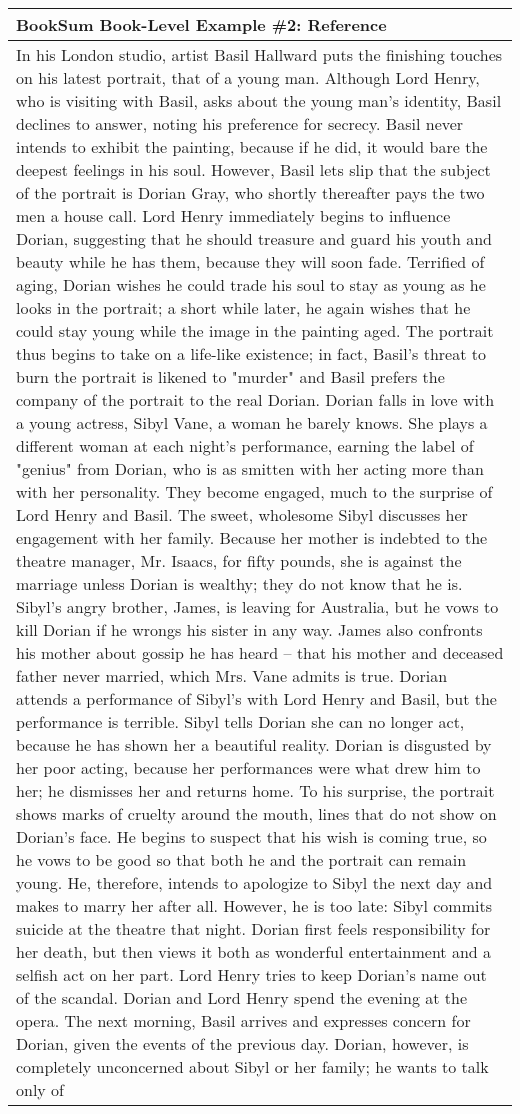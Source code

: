 \documentclass{article} \usepackage{iclr2022_conference,times}
\begin{document}
\begin{table}[!htbp]
    \centering
    \tiny    
    \begin{tabular}{p{\linewidth}} 
    \midrule
    \textbf{BookSum Book-Level Example \#2: Reference} \\
    \midrule
In his London studio, artist Basil Hallward puts the finishing touches on his latest portrait, that of a young man. Although Lord Henry, who is visiting with Basil, asks about the young man's identity, Basil declines to answer, noting his preference for secrecy. Basil never intends to exhibit the painting, because if he did, it would bare the deepest feelings in his soul. However, Basil lets slip that the subject of the portrait is Dorian Gray, who shortly thereafter pays the two men a house call. Lord Henry immediately begins to influence Dorian, suggesting that he should treasure and guard his youth and beauty while he has them, because they will soon fade. Terrified of aging, Dorian wishes he could trade his soul to stay as young as he looks in the portrait; a short while later, he again wishes that he could stay young while the image in the painting aged. The portrait thus begins to take on a life-like existence; in fact, Basil's threat to burn the portrait is likened to "murder" and Basil prefers the company of the portrait to the real Dorian. Dorian falls in love with a young actress, Sibyl Vane, a woman he barely knows. She plays a different woman at each night's performance, earning the label of "genius" from Dorian, who is as smitten with her acting more than with her personality. They become engaged, much to the surprise of Lord Henry and Basil. The sweet, wholesome Sibyl discusses her engagement with her family. Because her mother is indebted to the theatre manager, Mr. Isaacs, for fifty pounds, she is against the marriage unless Dorian is wealthy; they do not know that he is. Sibyl's angry brother, James, is leaving for Australia, but he vows to kill Dorian if he wrongs his sister in any way. James also confronts his mother about gossip he has heard -- that his mother and deceased father never married, which Mrs. Vane admits is true. Dorian attends a performance of Sibyl's with Lord Henry and Basil, but the performance is terrible. Sibyl tells Dorian she can no longer act, because he has shown her a beautiful reality. Dorian is disgusted by her poor acting, because her performances were what drew him to her; he dismisses her and returns home. To his surprise, the portrait shows marks of cruelty around the mouth, lines that do not show on Dorian's face. He begins to suspect that his wish is coming true, so he vows to be good so that both he and the portrait can remain young. He, therefore, intends to apologize to Sibyl the next day and makes to marry her after all. However, he is too late: Sibyl commits suicide at the theatre that night. Dorian first feels responsibility for her death, but then views it both as wonderful entertainment and a selfish act on her part. Lord Henry tries to keep Dorian's name out of the scandal. Dorian and Lord Henry spend the evening at the opera. The next morning, Basil arrives and expresses concern for Dorian, given the events of the previous day. Dorian, however, is completely unconcerned about Sibyl or her family; he wants to talk only of 
\end{tabular}
\end{table}
\end{document}
